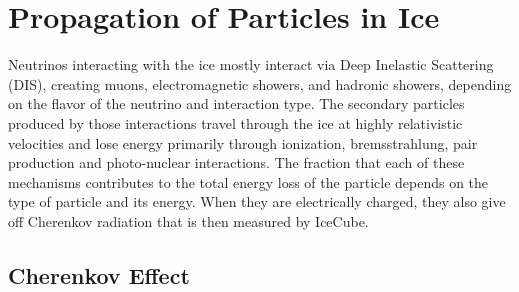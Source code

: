 \section{Propagation of Particles in Ice}
\label{sec:particle-interactions}
Neutrinos interacting with the ice mostly interact via Deep Inelastic Scattering (DIS), creating muons, electromagnetic showers, and hadronic showers, depending on the flavor of the neutrino and interaction type.
The secondary particles produced by those interactions travel through the ice at highly relativistic velocities and lose energy primarily through ionization, bremsstrahlung, pair production and photo-nuclear interactions. The fraction that each of these mechanisms contributes to the total energy loss of the particle depends on the type of particle and its energy. When they are electrically charged, they also give off Cherenkov radiation that is then measured by IceCube.

\subsection{Cherenkov Effect}

